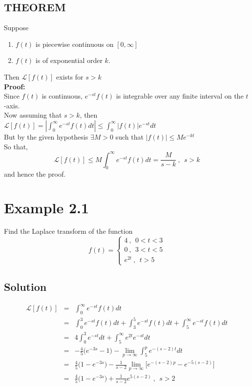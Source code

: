 \documentclass[11pt]{report}
\newcommand{\Laplace}{\mathcal{L}}
\newcommand{\ft}{f(t)}
\newcommand{\sbracket}[1]{\left[#1\right]}
\newcommand{\LFt}{\Laplace \sbracket{\ft}}
\newcommand{\sps}{\\[0.2cm]}
\newcommand{\bt}[1]{\textbf{#1}}
\newcommand{\dsp}{\displaystyle}
\begin{document}
	\subsection{THEOREM}
	\label{subsec:2_3_2}
	Suppose
	\begin{enumerate}
		\item $\ft$ is piecewise continuous on $[0,\infty]$
		\item $\ft$ is of exponential order $k$.
	\end{enumerate}
	Then $\LFt$ exists for $s > k$\sps
	\bt{Proof:}\\
	Since $\ft$ is continuous, $e^{-st}\ft$ is integrable over any finite interval on the $t$-axis.\\
	Now assuming that $s>k$, then\\
	$\dsp \LFt = \left| \int_0^\infty e^{-st}f(t)dt\right| \leq \int_0^\infty |\ft|e^{-st} dt$\\
	But by the given hypothesis $\exists M>0$ such that $|\ft| \leq Me^{-kt}$\\
	So that,\\
	$$
		\LFt \leq M\int_0^\infty e^{-st}f(t)dt = \dsp\frac{M}{s-k}~,~~ s > k
	$$
	and hence the proof.
	
	\section*{Example 2.1}
	Find the Laplace transform of the function\\
	\begin{equation*}
		f(t) = \left\{\begin{array}{l}
			4~,~~ 0 < t < 3\\
			0~, ~~ 3 < t < 5\\
			e^{2t}~, ~~ t > 5
		\end{array}\right.
	\end{equation*}

	\subsection*{Solution}
	\begin{eqnarray*}
		\LFt &=& \int_0^\infty e^{-st}\ft dt\\
		&=& \int_0^3 e^{-st}\ft dt + \int_3^5 e^{-st}\ft dt + \int_5^\infty e^{-st}\ft dt\\
		&=&4\int_0^3 e^{-st}dt + \int_5^\infty e^{2t}e^{-st}dt\\
		&=&-\frac{4}{5}\Big(e^{-3s} - 1\Big) - \lim\limits_{p\rightarrow\infty}\int_5^p e^{-(s-2)t}dt\\
		&=& \frac{4}{5}\Big(1-e^{-3s}\Big) - \frac{1}{s-2}\lim\limits_{p\rightarrow\infty}\Big[e^{-(s-2)p} - e^{-5(s-2)}\Big]\\
		&=&\frac{4}{5}\Big(1-e^{-3s}\Big)+ \frac{1}{s-2}e^{5(s-2)}~, ~~ s > 2
	\end{eqnarray*}
	
\end{document}
